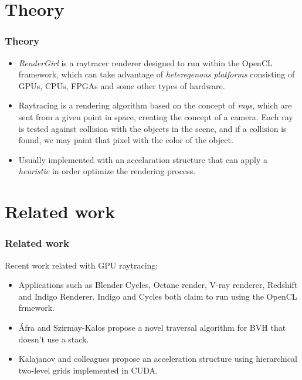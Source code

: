 \documentclass{beamer}
\begin{document}
\section{Theory}
\begin{frame}
\frametitle{Theory}

\begin{itemize}

\item \emph{RenderGirl} is a raytracer renderer designed to run within the
OpenCL framework, which can take advantage of \emph{heteregenous
  platforms} consisting of GPUs, CPUs, FPGAs and some other types of
hardware.

\item Raytracing is a rendering algorithm based on the concept of
\emph{rays}, which are sent from a given point in space, creating the
concept of a camera. Each ray is tested against collision with the
objects in the scene, and if a collision is found, we may paint that
pixel with the color of the object.

\item Usually implemented with an accelaration structure that can
  apply a \emph{heuristic} in order optimize the rendering process.

\end{itemize}

\end{frame}



\section{Related work}
\begin{frame}
\frametitle{Related work}

Recent work related with GPU raytracing:

\begin{itemize}

\item Applications such as Blender Cycles, Octane render, V-ray
  renderer, Redshift and Indigo Renderer. Indigo and Cycles both claim
  to run using the OpenCL frmework.

\item Áfra and Szirmay-Kalos propose a novel traversal algorithm for
  BVH that doesn't use a stack\cite{Afra}.

\item Kalajanov and colleagues propose an acceleration structure using
  hierarchical two-level grids implemented in CUDA\cite{Kalojanov}.

\end{itemize}

\end{frame}
\end{document}
